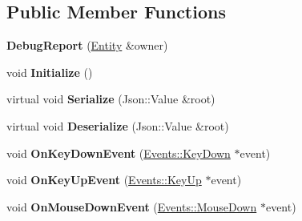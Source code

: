 \subsection*{Public Member Functions}
\begin{DoxyCompactItemize}
\item 
\hypertarget{classDCEngine_1_1Components_1_1DebugReport_ab78c1ed2ec3b1241694be410e2be3852}{{\bfseries Debug\-Report} (\hyperlink{classDCEngine_1_1Entity}{Entity} \&owner)}\label{classDCEngine_1_1Components_1_1DebugReport_ab78c1ed2ec3b1241694be410e2be3852}

\item 
\hypertarget{classDCEngine_1_1Components_1_1DebugReport_a7e1efd3025921037845f2d1a7e752986}{void {\bfseries Initialize} ()}\label{classDCEngine_1_1Components_1_1DebugReport_a7e1efd3025921037845f2d1a7e752986}

\item 
\hypertarget{classDCEngine_1_1Components_1_1DebugReport_aca3394ed432e4d19364fc8d34f781a36}{virtual void {\bfseries Serialize} (Json\-::\-Value \&root)}\label{classDCEngine_1_1Components_1_1DebugReport_aca3394ed432e4d19364fc8d34f781a36}

\item 
\hypertarget{classDCEngine_1_1Components_1_1DebugReport_a9479a8ee5e72b3a48915f0d7779eee63}{virtual void {\bfseries Deserialize} (Json\-::\-Value \&root)}\label{classDCEngine_1_1Components_1_1DebugReport_a9479a8ee5e72b3a48915f0d7779eee63}

\item 
\hypertarget{classDCEngine_1_1Components_1_1DebugReport_af19f4c53c360264dbb7d6d9315118a5c}{void {\bfseries On\-Key\-Down\-Event} (\hyperlink{classDCEngine_1_1Events_1_1KeyDown}{Events\-::\-Key\-Down} $\ast$event)}\label{classDCEngine_1_1Components_1_1DebugReport_af19f4c53c360264dbb7d6d9315118a5c}

\item 
\hypertarget{classDCEngine_1_1Components_1_1DebugReport_aa982742d1be781ed1f6948ea8036db1b}{void {\bfseries On\-Key\-Up\-Event} (\hyperlink{classDCEngine_1_1Events_1_1KeyUp}{Events\-::\-Key\-Up} $\ast$event)}\label{classDCEngine_1_1Components_1_1DebugReport_aa982742d1be781ed1f6948ea8036db1b}

\item 
\hypertarget{classDCEngine_1_1Components_1_1DebugReport_a3c96c8456be40a51bd94b0feef14a4be}{void {\bfseries On\-Mouse\-Down\-Event} (\hyperlink{classDCEngine_1_1Events_1_1MouseDown}{Events\-::\-Mouse\-Down} $\ast$event)}\label{classDCEngine_1_1Components_1_1DebugReport_a3c96c8456be40a51bd94b0feef14a4be}


\end{DoxyCompactItemize}
